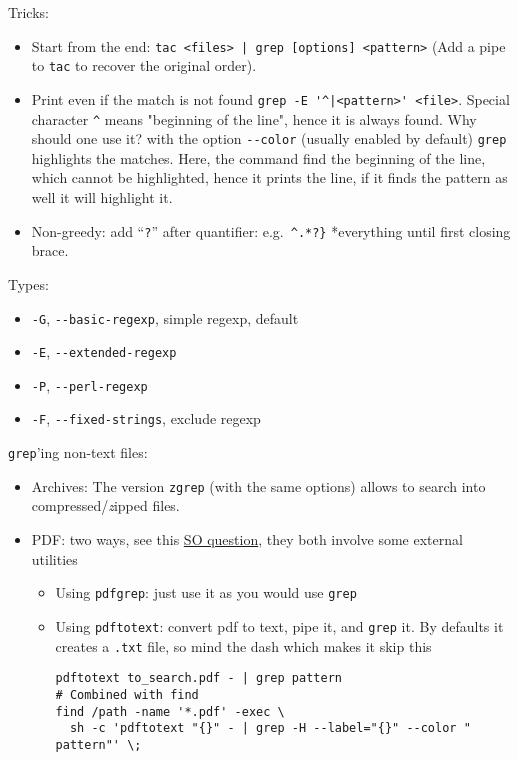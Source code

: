 \documentclass[a4paper,12pt,%
              final%
              ]{article}
\begin{document}
Tricks:
\begin{itemize}
  \item Start from the end: \verb!tac <files> | grep [options] <pattern>! (Add a pipe to \texttt{tac} to recover the original order).
  \item Print even if the match is not found \verb!grep -E '^|<pattern>' <file>!. Special character \verb|^| means "beginning of the line", hence it is always found. Why should one use it? with the option \verb|--color| (usually enabled by default) \verb|grep| highlights the matches. Here, the command find the beginning of the line, which cannot be highlighted, hence it prints the line, if it finds the pattern as well it will highlight it.
  \item Non-greedy: add ``\texttt{?}'' after quantifier: e.g.~\verb|^.*?}| *everything until first closing brace.
\end{itemize}

Types:
\begin{itemize}
  \item \texttt{-G}, \verb|--basic-regexp|, simple regexp, default
  \item \texttt{-E}, \verb|--extended-regexp|
  \item \texttt{-P}, \verb|--perl-regexp|
  \item \texttt{-F}, \verb|--fixed-strings|, exclude regexp
\end{itemize}

\texttt{grep}'ing non-text files:
\begin{itemize}
  \item Archives: The version \texttt{zgrep} (with the same options) allows to search into compressed/\emph{z}ipped files.
  \item PDF: two ways, see this \href{https://unix.stackexchange.com/questions/6704/how-can-i-grep-in-pdf-files}{SO question}, they both involve some external utilities
    \begin{itemize}
      \item Using \texttt{pdfgrep}: just use it as you would use \texttt{grep}
      \item Using \texttt{pdftotext}: convert pdf to text, pipe it, and \texttt{grep} it. By defaults it creates a \texttt{.txt} file, so mind the dash which makes it skip this
\begin{verbatim}
pdftotext to_search.pdf - | grep pattern
# Combined with find
find /path -name '*.pdf' -exec \
  sh -c 'pdftotext "{}" - | grep -H --label="{}" --color " pattern"' \;
\end{verbatim}
    \end{itemize}
\end{itemize}
\end{document}
